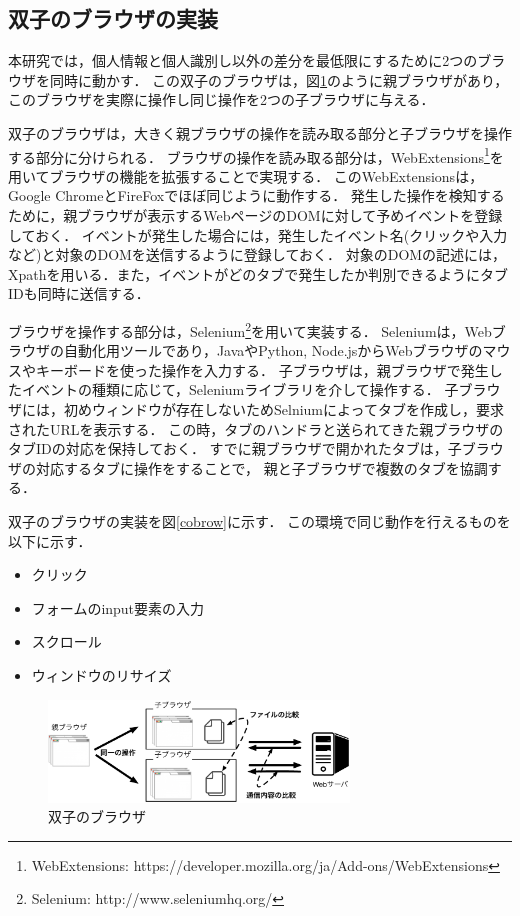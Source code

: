 \documentclass[submit,techrep]{ipsj}
\begin{document}
\begin{itemize}
\section{双子のブラウザの実装}
本研究では，個人情報と個人識別し以外の差分を最低限にするために2つのブラウザを同時に動かす．
この双子のブラウザは，図\ref{twin-brow}のように親ブラウザがあり，このブラウザを実際に操作し同じ操作を2つの子ブラウザに与える．


双子のブラウザは，大きく親ブラウザの操作を読み取る部分と子ブラウザを操作する部分に分けられる．
ブラウザの操作を読み取る部分は，WebExtensions\footnote{WebExtensions: https://developer.mozilla.org/ja/Add-ons/WebExtensions}を用いてブラウザの機能を拡張することで実現する．
このWebExtensionsは，Google ChromeとFireFoxでほぼ同じように動作する．
発生した操作を検知するために，親ブラウザが表示するWebページのDOMに対して予めイベントを登録しておく．
イベントが発生した場合には，発生したイベント名(クリックや入力など)と対象のDOMを送信するように登録しておく．
対象のDOMの記述には，Xpathを用いる．また，イベントがどのタブで発生したか判別できるようにタブIDも同時に送信する．

ブラウザを操作する部分は，Selenium\footnote{Selenium: http://www.seleniumhq.org/}を用いて実装する．
Seleniumは，Webブラウザの自動化用ツールであり，JavaやPython, Node.jsからWebブラウザのマウスやキーボードを使った操作を入力する．
子ブラウザは，親ブラウザで発生したイベントの種類に応じて，Seleniumライブラリを介して操作する．
子ブラウザには，初めウィンドウが存在しないためSelniumによってタブを作成し，要求されたURLを表示する．
この時，タブのハンドラと送られてきた親ブラウザのタブIDの対応を保持しておく．
すでに親ブラウザで開かれたタブは，子ブラウザの対応するタブに操作をすることで，
親と子ブラウザで複数のタブを協調する．

双子のブラウザの実装を図\ref{cobrow}に示す．
この環境で同じ動作を行えるものを以下に示す．
\begin{itemize}
\item { クリック}
\item{ フォームのinput要素の入力 }
\item{ スクロール}
\item{ウィンドウのリサイズ}
\end{itemize}	

\begin{figure}[t]
\begin{center}
\includegraphics[width=8cm]{img/twin-brow-p.eps}
 \caption{双子のブラウザ}
  \label{twin-brow}
  \end{center}
\end{figure}


\end{itemize}
\end{document}
